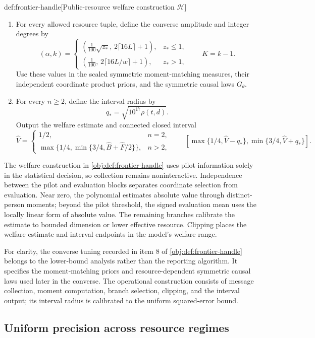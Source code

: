 \begin{algorithmv}{def:frontier-handle}[Public-resource welfare construction $\mathscr H$]
\begin{enumerate}
\item For every allowed resource tuple, define the converse amplitude and integer degrees by
\[
(\alpha,k)=
\begin{cases}
\left(\displaystyle\frac1{100}\sqrt{z_*},
\,2\lceil16L\rceil+1\right),&z_*\le1,\\[3pt]
\left(\displaystyle\frac1{100},
\,2\lceil16L/w\rceil+1\right),&z_*>1,
\end{cases}
\qquad K=k-1.
\]
Use these values in the scaled symmetric moment-matching measures, their independent coordinate product priors, and the symmetric causal laws \(G_\theta\).

\item For every \(n\ge2\), define the interval radius by
\[
q_*=\sqrt{10^{17}\rho(t,d)}.
\]
Output the welfare estimate and connected closed interval
\[
\widehat V=
\begin{cases}
1/2,&n=2,\\
\max\{1/4,\min\{3/4,\widehat B+\widehat F/2\}\},&n>2,
\end{cases}
\qquad
\left[
\max\{1/4,\widehat V-q_*\},
\min\{3/4,\widehat V+q_*\}
\right].
\]
\end{enumerate}
\end{algorithmv}

The welfare construction  in \cref{obj:def:frontier-handle} uses pilot information solely in the statistical decision, so collection remains noninteractive. Independence between the pilot and evaluation blocks separates coordinate selection from evaluation. Near zero, the polynomial estimates absolute value through distinct-person moments; beyond the pilot threshold, the signed evaluation mean uses the locally linear form of absolute value. The remaining branches calibrate the estimate to bounded dimension or lower effective resource. Clipping places the welfare estimate and interval endpoints in the model's welfare range.

For clarity, the converse tuning recorded in item 8 of \cref{obj:def:frontier-handle} belongs to the lower-bound analysis rather than the reporting algorithm. It specifies the moment-matching priors and resource-dependent symmetric causal laws used later in the converse. The operational construction consists of message collection, moment computation, branch selection, clipping, and the interval output; its interval radius is calibrated to the uniform squared-error bound.

\subsection{Uniform precision across resource regimes}

